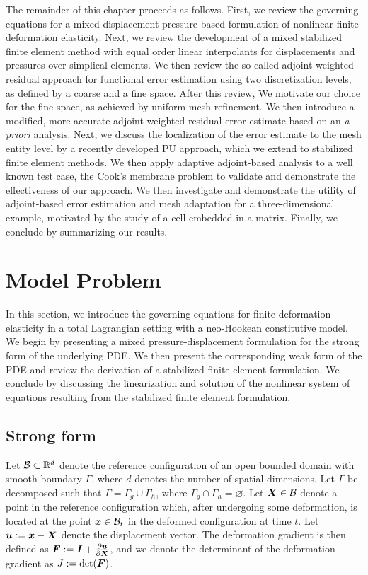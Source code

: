 The remainder of this chapter proceeds as follows. First, we review the
governing equations for a mixed displacement-pressure based formulation of
nonlinear finite deformation elasticity. Next, we review the development of
a mixed stabilized finite element method with equal order linear interpolants
for displacements and pressures over simplical elements. We then review the
so-called adjoint-weighted residual approach for functional error estimation
using two discretization levels, as defined by a coarse and a fine space.
After this review, We motivate our choice for the fine space, as achieved
by uniform mesh refinement. We then introduce a modified, more accurate
adjoint-weighted residual error estimate based on an \emph{a priori}
analysis. Next, we discuss the localization of the error estimate to the
mesh entity level by a recently developed PU approach, which we extend to
stabilized finite element methods. We then apply adaptive adjoint-based
analysis to a well known test case, the Cook's membrane problem to validate
and demonstrate the effectiveness of our approach. We then investigate and
demonstrate the utility of adjoint-based error estimation and mesh adaptation
for a three-dimensional example, motivated by the study of a cell embedded in
a matrix. Finally, we conclude by summarizing our results.

\section{Model Problem}

In this section, we introduce the governing equations for finite deformation
elasticity in a total Lagrangian setting with a neo-Hookean constitutive model.
We begin by presenting a mixed pressure-displacement formulation for the
strong form of the underlying PDE. We then present the corresponding weak form
of the PDE and review the derivation of a stabilized finite element
formulation. We conclude by discussing the linearization and solution
of the nonlinear system of equations resulting from the stabilized
finite element formulation.

\subsection{Strong form}

Let $\mathcal{B} \subset \mathbb{R}^d$ denote the reference configuration of an open
bounded domain with smooth boundary $\Gamma$, where $d$ denotes the number of
spatial dimensions. Let $\Gamma$ be decomposed such that $\Gamma = \Gamma_g
\cup \Gamma_h$, where $\Gamma_g \cap \Gamma_h = \varnothing$. Let $\boldsymbol{X} \in
\mathcal{B}$ denote a point in the reference configuration which, after undergoing some
deformation, is located at the point $\boldsymbol{x} \in \mathcal{B}_t$ in the deformed
configuration at time $t$. Let $\boldsymbol{u} := \boldsymbol{x} - \boldsymbol{X}$ denote the
displacement vector. The deformation gradient is then defined as $\boldsymbol{F} :=
\boldsymbol{I} + \frac{\partial \boldsymbol{u}}{\partial \boldsymbol{X}}$, and we denote the
determinant of the deformation gradient as $J := \det(\boldsymbol{F})$.

